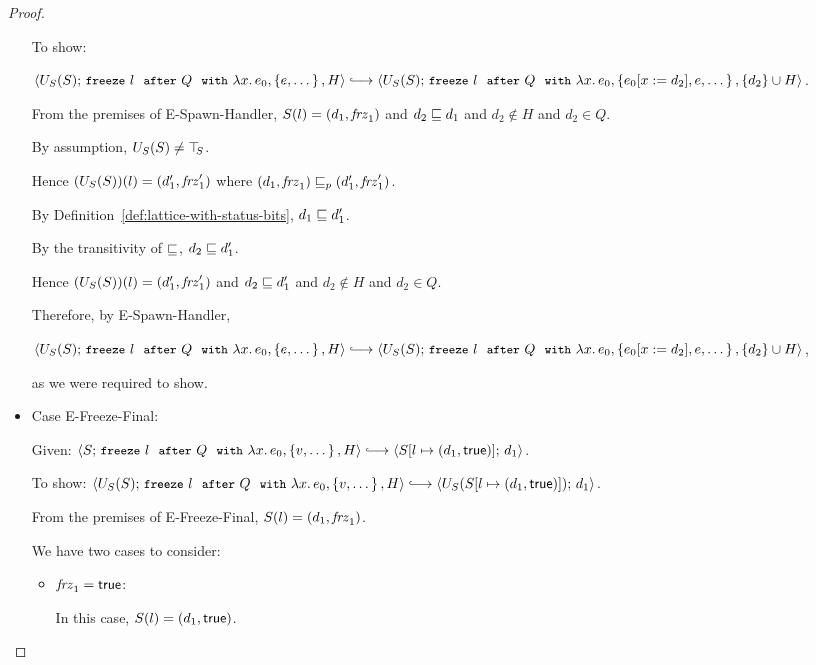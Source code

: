 \begin{proof}
\begin{itemize}
    To show:

    $\config{U_S(S)}{\freezeafterfull{l}{Q}{\lam{x}{e_0}}{\setof{e,
          \dots}}{H}} \parstepsto
    \\ \config{U_S(S)}{\freezeafterfull{l}{Q}{\lam{x}{e_0}}{\setof{\subst{e_0}{x}{d_2},
          e, \dots}} {\{d_2\}\cup H}}$.

    From the premises of {\sc E-Spawn-Handler}, $S(l) =
    (d_1, \mathit{frz}_1)$ and $d_2 \sqsubseteq d_1$ and $d_2 \notin H$
    and $d_2 \in Q$.

    By assumption, $U_S(S) \neq \top\hspace{-0.85mm}_{S}$.

    Hence $(U_S(S))(l) = (d'_1, \mathit{frz}'_1)$ where
    $(d_1, \mathit{frz}_1) \sqsubseteq_p (d'_1, \mathit{frz}'_1)$.

    By Definition~\ref{def:lattice-with-status-bits}, $d_1 \sqsubseteq
    d'_1$.

    By the transitivity of $\sqsubseteq$, $d_2 \sqsubseteq d'_1$.

    Hence $(U_S(S))(l) = (d'_1, \mathit{frz}'_1)$ and $d_2 \sqsubseteq
    d'_1$ and $d_2 \notin H$ and $d_2 \in Q$.

    Therefore, by {\sc E-Spawn-Handler},

    $\config{U_S(S)}{\freezeafterfull{l}{Q}{\lam{x}{e_0}}{\setof{e,
          \dots}}{H}} \parstepsto
    \\ \config{U_S(S)}{\freezeafterfull{l}{Q}{\lam{x}{e_0}}{\setof{\subst{e_0}{x}{d_2},
          e, \dots}} {\{d_2\}\cup H}}$,

    as we were required to show.

  \item Case {\sc E-Freeze-Final}:

    Given: $\config{S}{\freezeafterfull{l}{Q}{\lam{x}{e_0}}{\setof{v,
          \dots}}{H}} \parstepsto
    \\ \config{\extS{S}{l}{d_1}{\frozentrue}}{d_1}$.

    To show:
    $\config{U_S(S)}{\freezeafterfull{l}{Q}{\lam{x}{e_0}}{\setof{v,
          \dots}}{H}} \parstepsto
    \\ \config{U_S(\extS{S}{l}{d_1}{\frozentrue})}{d_1}$.

    From the premises of {\sc E-Freeze-Final}, $S(l) =
    (d_1, \mathit{frz}_1)$.

    We have two cases to consider:
    \begin{itemize}
    \item $\mathit{frz}_1 = \textsf{true}$:

      In this case, $S(l) = (d_1, \textsf{true})$.


\end{itemize}
\end{itemize}
\end{proof}
